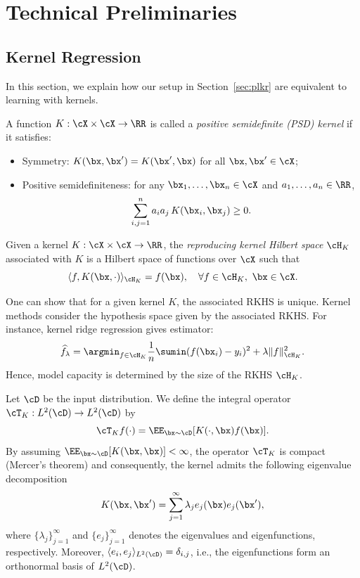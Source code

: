 \newpage
\section{Technical Preliminaries}

\subsection{Kernel Regression}
In this section, we explain how our setup in Section~\ref{sec:plkr} are equivalent to learning with kernels. 

\begin{definition}
A function $K:\cX\times \cX \to \RR$ is called a \emph{positive semidefinite (PSD) kernel} if it satisfies:
\begin{itemize}
  \item Symmetry: $K(\bx,\bx') = K(\bx',\bx)$ for all $\bx,\bx' \in \cX$;
  \item Positive semidefiniteness: for any $\bx_1,\dots,\bx_n \in \cX$ and $a_1,\dots,a_n \in \RR$,  
  \[
    \sum_{i,j=1}^n a_i a_j\, K(\bx_i,\bx_j) \ge 0.
  \]
\end{itemize}
\end{definition}


\begin{definition}
Given a kernel $K:\cX\times\cX\to\RR$, the \emph{reproducing kernel Hilbert space} $\cH_K$ associated with $K$ is a Hilbert space of functions over $\cX$ such that
\[
  \langle f, K(\bx, \cdot) \rangle_{\cH_K} = f(\bx),
  \quad \forall f \in \cH_K,~\bx \in \cX.
\]
\end{definition}
One can show that for a given kernel $K$, the associated RKHS is unique.
Kernel methods consider the hypothesis space given by the associated RKHS. For instance, kernel ridge regression gives estimator:
\[
  \widehat{f}_\lambda = \argmin_{f\in \cH_K} \frac{1}{n}\sumin (f(\bx_i)-y_i)^2 + \lambda \|f\|_{\cH_K}^2.
\]
Hence, model capacity is determined by the size of the RKHS $\cH_K$.


Let $\cD$ be the input distribution. We define the integral operator $\cT_K: L^2(\cD)\to L^2(\cD)$ by 
\[
  \cT_K f(\cdot) = \EE_{\bx\sim\cD} [K(\cdot,\bx) f(\bx)].
\]
By assuming
$\EE_{\bx\sim\cD} [K(\bx,\bx)]< \infty$, 
the operator $\cT_K$ is compact (Mercer's theorem) and consequently, the kernel admits the following eigenvalue decomposition
\[
K(\bx, \bx') = \sum_{j=1}^{\infty} \lambda_j e_j(\bx)e_j(\bx'),
\]
where $\{\lambda_j\}_{j=1}^\infty$ and $\{e_j\}_{j=1}^\infty$ denotes the eigenvalues and eigenfunctions, respectively. Moreover, $\langle e_i,e_j\rangle_{L^2(\cD)}=\delta_{i,j}$, i.e., the eigenfunctions form an orthonormal basis of $L^2(\cD)$. 


